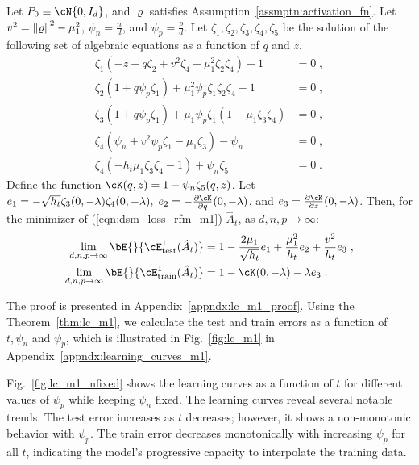 \begin{theorem}\label{thm:lc_m1}
    Let $P_0\equiv\cN{0,I_d}$, and $\varrho$ satisfies Assumption~\ref{assmptn:activation_fn}. Let $v^2 = \norm{\varrho}^2-\mu_1^2$,\; $\psi_n = \frac{n}{d}$, and $\psi_p = \frac{p}{d}$. Let $\zeta_1,\zeta_2,\zeta_3,\zeta_4,\zeta_5$ be the solution of the following set of algebraic equations as a function of $q$ and $z$.
    \begin{align*}
    \zeta_1(-z+q\zeta_2+v^2\zeta_4+\mu_1^2\zeta_2\zeta_4) -1&= 0\;,\\
    \zeta_2(1+q\psi_p \zeta_1) +\mu_1^2\psi_p\zeta_1\zeta_2\zeta_4 -1&= 0\;,\\
    \zeta_3(1+q\psi_p \zeta_1) +\mu_1\psi_p\zeta_1(1+\mu_1\zeta_3\zeta_4) &= 0\;,\\
    \zeta_4(\psi_n+v^2\psi_p\zeta_1-\mu_1\zeta_3)-\psi_n &= 0\;,\\
    \zeta_4(-h_t\mu_1\zeta_3\zeta_4-1)+\psi_n\zeta_5 &= 0\;. 
\end{align*}
    Define the function $\cK(q,z) = 1-\psi_n\zeta_5(q,z)$. Let $e_1 = -\sqrt{h_t}\zeta_3(0,-\lambda)\zeta_4(0,-\lambda),\; e_2 = -\frac{\partial \cK}{\partial q}(0,-\lambda)$, and $e_3 = \frac{\partial \cK}{\partial z}(0,-\lambda)$. Then, for
    the minimizer of (\ref{eqn:dsm_loss_rfm_m1}) $\hat{A}_t$, as $d,n,p\to\infty$:
    \begin{align*}
        \lim_{d,n,p\to\infty}\bE{}{\cE^1_{\text{test}}(\hat{A}_t)} &= 1-\frac{2\mu_1}{\sqrt{h_t}}e_1+\frac{\mu_1^2}{h_t}e_2+\frac{v^2}{h_t}e_3\;,\\
    \lim_{d,n,p\to\infty}\bE{}{\cE^1_{\text{train}}(\hat{A}_t)} &= 1-\cK(0,-\lambda)-\lambda e_3\;.
    \end{align*}
\end{theorem}
The proof is presented in Appendix~\ref{appndx:lc_m1_proof}. Using the Theorem~\ref{thm:lc_m1}, we calculate the test and train errors as a function of $t,\psi_n$ and $\psi_p$, which is illustrated in Fig.~\ref{fig:lc_m1} in Appendix~\ref{appndx:learning_curves_m1}.%

Fig.~\ref{fig:lc_m1_nfixed} shows the learning curves as a function of $t$ for different values of $\psi_p$ while keeping $\psi_n$ fixed. The learning curves reveal several notable trends. The test error increases as $t$ decreases; however, it shows a non-monotonic behavior with $\psi_p$. The train error decreases monotonically with increasing $\psi_p$ for all $t$, indicating the model's progressive capacity to interpolate the training data. 

